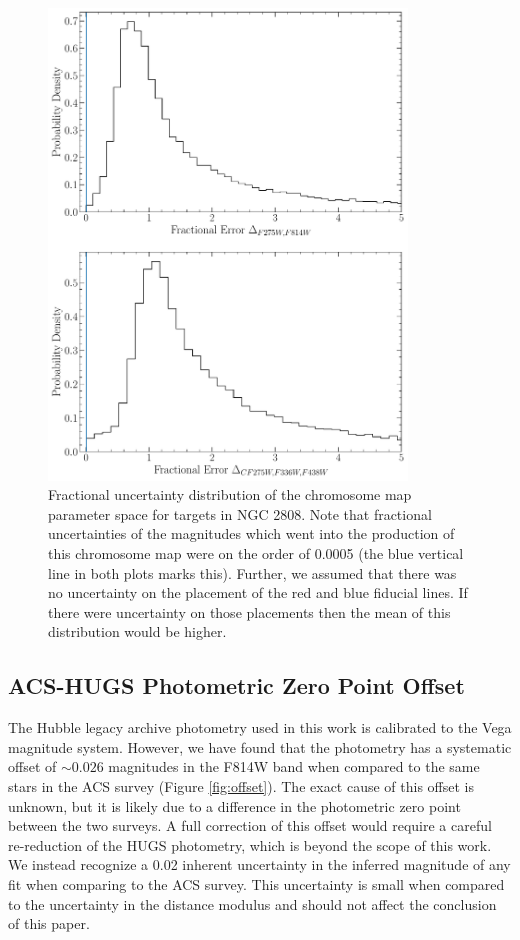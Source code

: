 \begin{figure}
  \centering
  \includegraphics[width=0.85\textwidth]{figures/ngc2808/ChromosomeMapFractionalErrorDist.pdf}
  \caption{Fractional uncertainty distribution of the chromosome map parameter
  space for targets in NGC 2808. Note that fractional uncertainties of the
  magnitudes which went into the production of this chromosome map were on the
  order of 0.0005 (the blue vertical line in both plots marks this). Further,
  we assumed that there was no uncertainty on the placement of the red and blue
  fiducial lines. If there were uncertainty on those placements then the mean
  of this distribution would be higher.}
  \label{fig:chromMapUn}
\end{figure}

\subsection{ACS-HUGS Photometric Zero Point Offset}
The Hubble legacy archive photometry used in this work is calibrated to the
Vega magnitude system. However, we have found that the photometry has a
systematic offset of $\sim0.026$ magnitudes in the F814W band when
compared to the same stars in the ACS survey (Figure \ref{fig:offset}). The
exact cause of this offset is unknown, but it is likely due to a difference in
the photometric zero point between the two surveys. A full correction of this
offset would require a careful re-reduction of the HUGS photometry, which is
beyond the scope of this work. We instead recognize a 0.02 inherent uncertainty
in the inferred magnitude of any fit when comparing to the ACS survey. This
uncertainty is small when compared to the uncertainty in the
distance modulus and should not affect the conclusion of this
paper. 

